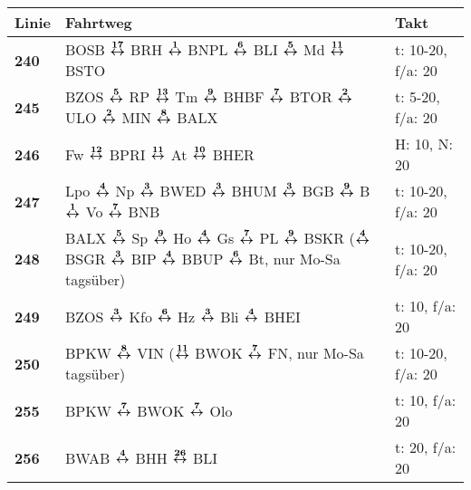 \begin{minipage}[t]{0.45\textwidth}
\begin{tabular}{>{\bfseries}L{1.2cm}L{9.0cm}L{3.0cm}}
{\bfseries Linie} & {\bfseries Fahrtweg} & {\bfseries Takt} \\
\hline
\bus{} 240    & BOSB $\xarwe{17}$ BRH $\xarwe{1}$ BNPL $\xarwe{6}$ BLI $\xarwe{5}$ Md $\xarwe{11}$ BSTO                                                                             & t: 10-20, f/a: 20          \\
\bus{} 245    & BZOS $\xarwe{5}$ RP $\xarwe{13}$ Tm $\xarwe{9}$ BHBF $\xarwe{7}$ BTOR $\xarwe{2}$ ULO $\xarwe{2}$ MIN $\xarwe{8}$ BALX                                              & t: 5-20, f/a: 20           \\
\bus{} 246    & Fw $\xarwe{12}$ BPRI $\xarwe{11}$ At $\xarwe{10}$ BHER                                                                                                              & H: 10, N: 20               \\
\bus{} 247    & Lpo $\xarwe{4}$ Np $\xarwe{3}$ BWED $\xarwe{3}$ BHUM $\xarwe{3}$ BGB $\xarwe{9}$ B $\xarwe{1}$ Vo $\xarwe{7}$ BNB                                                   & t: 10-20, f/a: 20          \\
\bus{} 248    & BALX $\xarwe{5}$ Sp $\xarwe{9}$ Ho $\xarwe{4}$ Gs $\xarwe{7}$ PL $\xarwe{9}$ BSKR ($\xarwe{4}$ BSGR $\xarwe{3}$ BIP $\xarwe{4}$ BBUP $\xarwe{6}$ Bt, %
                nur Mo-Sa tagsüber)                                                                                                                                                 & t: 10-20, f/a: 20          \\
\bus{} 249    & BZOS $\xarwe{3}$ Kfo $\xarwe{6}$ Hz $\xarwe{3}$ Bli $\xarwe{4}$ BHEI                                                                                                & t: 10, f/a: 20             \\
\bus{} 250    & BPKW $\xarwe{8}$ VIN ($\xarwe{11}$ BWOK $\xarwe{7}$ FN, nur Mo-Sa tagsüber)                                                                                         & t: 10-20, f/a: 20          \\
\bus{} 255    & BPKW $\xarwe{7}$ BWOK $\xarwe{7}$ Olo                                                                                                                               & t: 10, f/a: 20             \\
\bus{} 256    & BWAB $\xarwe{4}$ BHH $\xarwe{26}$ BLI                                                                                                                               & t: 20, f/a: 20             \\

\end{tabular}
\end{minipage}
